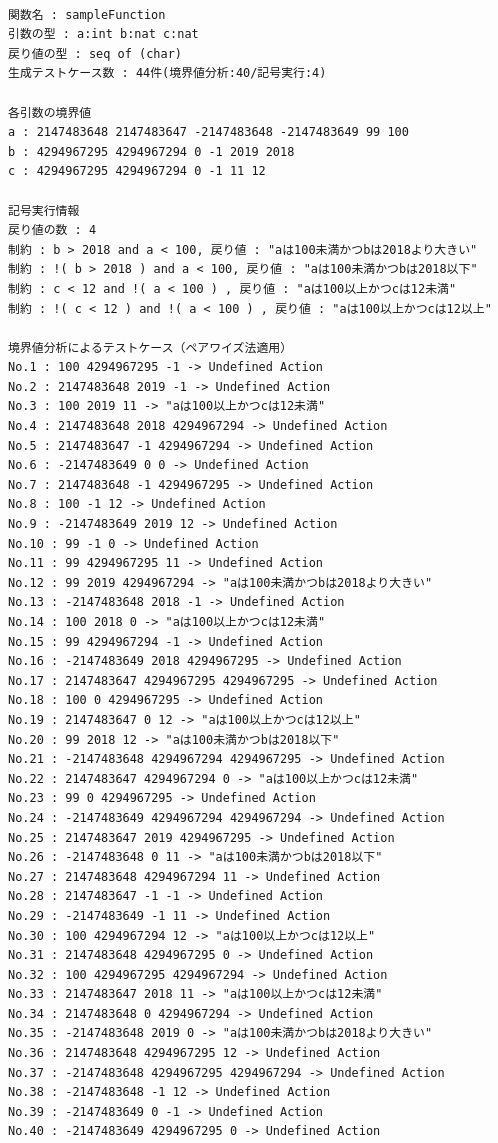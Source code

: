 \documentclass[uplatex, report, a4j, 10pt]{jsbook}
\begin{document}
\lstset{language=}
\noindent\begin{minipage}{\textwidth}
  \begin{lstlisting}[caption=(コード\ref{fig:pict4javaSampleVdm})の適用結果,label=fig:pict4javaTekiyourei]

関数名 : sampleFunction
引数の型 : a:int b:nat c:nat 
戻り値の型 : seq of (char)
生成テストケース数 : 44件(境界値分析:40/記号実行:4)

各引数の境界値
a : 2147483648 2147483647 -2147483648 -2147483649 99 100 
b : 4294967295 4294967294 0 -1 2019 2018 
c : 4294967295 4294967294 0 -1 11 12 

記号実行情報
戻り値の数 : 4
制約 : b > 2018 and a < 100, 戻り値 : "aは100未満かつbは2018より大きい"
制約 : !( b > 2018 ) and a < 100, 戻り値 : "aは100未満かつbは2018以下"
制約 : c < 12 and !( a < 100 ) , 戻り値 : "aは100以上かつcは12未満"
制約 : !( c < 12 ) and !( a < 100 ) , 戻り値 : "aは100以上かつcは12以上"

境界値分析によるテストケース（ペアワイズ法適用）
No.1 : 100 4294967295 -1 -> Undefined Action
No.2 : 2147483648 2019 -1 -> Undefined Action
No.3 : 100 2019 11 -> "aは100以上かつcは12未満"
No.4 : 2147483648 2018 4294967294 -> Undefined Action
No.5 : 2147483647 -1 4294967294 -> Undefined Action
No.6 : -2147483649 0 0 -> Undefined Action
No.7 : 2147483648 -1 4294967295 -> Undefined Action
No.8 : 100 -1 12 -> Undefined Action
No.9 : -2147483649 2019 12 -> Undefined Action
No.10 : 99 -1 0 -> Undefined Action
No.11 : 99 4294967295 11 -> Undefined Action
No.12 : 99 2019 4294967294 -> "aは100未満かつbは2018より大きい"
No.13 : -2147483648 2018 -1 -> Undefined Action
No.14 : 100 2018 0 -> "aは100以上かつcは12未満"
No.15 : 99 4294967294 -1 -> Undefined Action
No.16 : -2147483649 2018 4294967295 -> Undefined Action
No.17 : 2147483647 4294967295 4294967295 -> Undefined Action
No.18 : 100 0 4294967295 -> Undefined Action
No.19 : 2147483647 0 12 -> "aは100以上かつcは12以上"
No.20 : 99 2018 12 -> "aは100未満かつbは2018以下"
No.21 : -2147483648 4294967294 4294967295 -> Undefined Action
No.22 : 2147483647 4294967294 0 -> "aは100以上かつcは12未満"
No.23 : 99 0 4294967295 -> Undefined Action
No.24 : -2147483649 4294967294 4294967294 -> Undefined Action
No.25 : 2147483647 2019 4294967295 -> Undefined Action
No.26 : -2147483648 0 11 -> "aは100未満かつbは2018以下"
No.27 : 2147483648 4294967294 11 -> Undefined Action
No.28 : 2147483647 -1 -1 -> Undefined Action
No.29 : -2147483649 -1 11 -> Undefined Action
No.30 : 100 4294967294 12 -> "aは100以上かつcは12以上"
No.31 : 2147483648 4294967295 0 -> Undefined Action
No.32 : 100 4294967295 4294967294 -> Undefined Action
No.33 : 2147483647 2018 11 -> "aは100以上かつcは12未満"
No.34 : 2147483648 0 4294967294 -> Undefined Action
No.35 : -2147483648 2019 0 -> "aは100未満かつbは2018より大きい"
No.36 : 2147483648 4294967295 12 -> Undefined Action
No.37 : -2147483648 4294967295 4294967294 -> Undefined Action
No.38 : -2147483648 -1 12 -> Undefined Action
No.39 : -2147483649 0 -1 -> Undefined Action
No.40 : -2147483649 4294967295 0 -> Undefined Action
\end{lstlisting}
\end{minipage}
\end{document}
